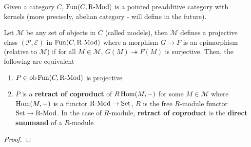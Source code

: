 \documentclass{article}
\begin{document}
\begin{proposition}
    Given a category $C$, $\operatorname{Fun}(C, \operatorname{R-Mod})$ is a pointed preadditive category with kernels (more precisely, abelian category - will define in the future).

    Let $\mathcal{M}$ be any set of objects in $C$ (called models), then $\mathcal{M}$ defines a projective class $(\mathcal{P}, \mathcal{E})$ in $\operatorname{Fun}(C, \operatorname{R-Mod})$ where a morphism $G \to F$ is an epimorphism (relative to $\mathcal{M}$) if for all $M \in \mathcal{M}$, $G(M) \twoheadrightarrow F(M)$ is surjective. Then, the following are equivalent
    
    \begin{enumerate}
        \item $P \in \operatorname{ob} \operatorname{Fun}(C, \operatorname{R-Mod})$ is projective
        \item $P$ is a \textbf{retract of coproduct} of $R \operatorname{Hom}(M, -)$ for some $M \in \mathcal{M}$ where $\operatorname{Hom}(M, -)$ is a functor $\operatorname{R-Mod} \to \operatorname{Set}$, $R$ is the free $R$-module functor $\operatorname{Set} \to \operatorname{R-Mod}$. In the case of $R$-module, \textbf{retract of coproduct} is the \textbf{direct summand} of a $R$-module
    \end{enumerate}
\end{proposition}

\begin{proof}
\end{proof}

\begin{theorem}
\end{theorem}
\end{document}
